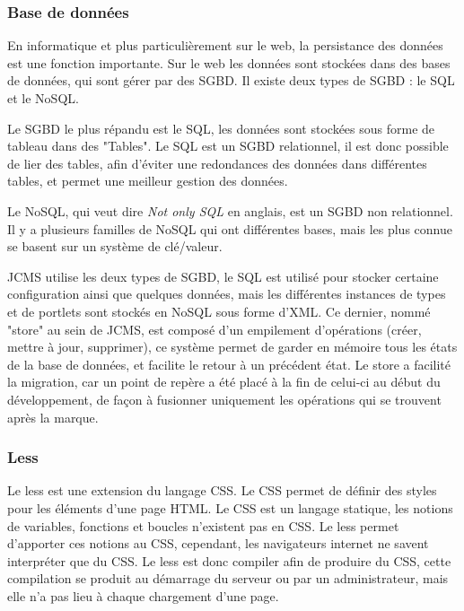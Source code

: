 \documentclass[12pt,a4paper]{article}
\begin{document}
\subsubsection{Base de données}
En informatique et plus particulièrement sur le web, la persistance des données est une fonction importante. Sur le web les données sont stockées dans des bases de données, qui sont gérer par des \gls{SGBD}. Il existe deux types de \gls{SGBD} : le SQL et le NoSQL.\par 
\medskip
Le \gls{SGBD} le plus répandu est le SQL, les données sont stockées sous forme de tableau dans des "Tables". Le SQL est un \gls{SGBD} relationnel, il est donc possible de lier des tables, afin d'éviter une redondances des données dans différentes tables, et permet une meilleur gestion des données.\par
\medskip
Le NoSQL, qui veut dire \textit{Not only SQL} en anglais, est un \gls{SGBD} non relationnel. Il y a plusieurs familles de NoSQL qui ont différentes bases, mais les plus connue se basent sur un système de clé/valeur.\par
\medskip
\gls{JCMS} utilise les deux types de \gls{SGBD}, le SQL est utilisé pour stocker certaine configuration ainsi que quelques données, mais les différentes instances de types et de portlets sont stockés en NoSQL sous forme d'XML. Ce dernier, nommé "store" au sein de \gls{JCMS}, est composé d'un empilement d'opérations (créer, mettre à jour, supprimer), ce système permet de garder en mémoire tous les états de la base de données, et facilite le retour à un précédent état. Le store a facilité la migration, car un point de repère a été placé à la fin de celui-ci au début du développement, de façon à fusionner uniquement les opérations qui se trouvent après la marque.\par

\subsubsection{Less}
Le less est une extension du langage CSS. Le CSS permet de définir des styles pour les éléments d'une page HTML. Le CSS est un langage statique, les notions de variables, fonctions et boucles n'existent pas en CSS. Le less permet d'apporter ces notions au CSS, cependant, les navigateurs internet ne savent interpréter que du CSS. Le less est donc compiler afin de produire du CSS, cette compilation se produit au démarrage du serveur ou par un administrateur, mais elle n'a pas lieu à chaque chargement d'une page.
\end{document}
